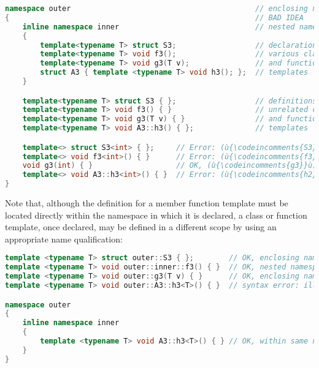 \begin{lstlisting}[language=C++]
namespace outer                                          // enclosing namespace
{                                                        // BAD IDEA
    inline namespace inner                               // nested namespace
    {
        template<typename T> struct S3;                  // declarations of
        template<typename T> void f3();                  // various class
        template<typename T> void g3(T v);               // and function
        struct A3 { template <typename T> void h3(); };  // templates
    }

    template<typename T> struct S3 { };                  // definitions of
    template<typename T> void f3() { }                   // unrelated class
    template<typename T> void g3(T v) { }                // and function
    template<typename T> void A3::h3() { };              // templates

    template<> struct S3<int> { };     // Error: (ù{\codeincomments{S3}}ù) is ambiguous in (ù{\codeincomments{outer}}ù).
    template<> void f3<int>() { }      // Error: (ù{\codeincomments{f3}}ù) is ambiguous in (ù{\codeincomments{outer}}ù).
    void g3(int) { }                   // OK, (ù{\codeincomments{g3}}ù) is an *overload* definition.
    template<> void A3::h3<int>() { }  // Error: (ù{\codeincomments{h2}}ù) is ambiguous in (ù{\codeincomments{outer}}ù).
}
\end{lstlisting}

\noindent Note that, although the definition for a member function template must
be located directly within the namespace in which it is declared, a
class or function template, once declared, may be defined in a different
scope by using an appropriate name qualification:

\begin{lstlisting}[language=C++]
template <typename T> struct outer::S3 { };        // OK, enclosing namespace
template <typename T> void outer::inner::f3() { }  // OK, nested namespace
template <typename T> void outer::g3(T v) { }      // OK, enclosing namespace
template <typename T> void outer::A3::h3<T>() { }  // syntax error: ill-formed

namespace outer
{
    inline namespace inner
    {
        template <typename T> void A3::h3<T>() { } // OK, within same namespace
    }
}
\end{lstlisting}

